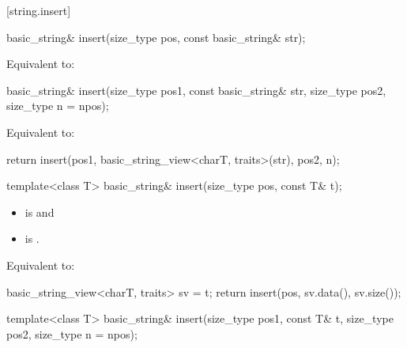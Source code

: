 [string.insert]{}

%
\begin{itemdecl}
basic_string& insert(size_type pos, const basic_string& str);
\end{itemdecl}

\begin{itemdescr}
\pnum
\effects Equivalent to: 
\end{itemdescr}

%
\begin{itemdecl}
basic_string& insert(size_type pos1, const basic_string& str, size_type pos2, size_type n = npos);
\end{itemdecl}

\begin{itemdescr}
\pnum
\effects
Equivalent to:
\begin{codeblock}
return insert(pos1, basic_string_view<charT, traits>(str), pos2, n);
\end{codeblock}
\end{itemdescr}

%
\begin{itemdecl}
template<class T>
  basic_string& insert(size_type pos, const T& t);
\end{itemdecl}

\begin{itemdescr}
\pnum
\constraints
\begin{itemize}
\item
{} is
 and
\item
{} is
.
\end{itemize}

\pnum
\effects
Equivalent to:
\begin{codeblock}
basic_string_view<charT, traits> sv = t;
return insert(pos, sv.data(), sv.size());
\end{codeblock}
\end{itemdescr}

%
\begin{itemdecl}
template<class T>
  basic_string& insert(size_type pos1, const T& t, size_type pos2, size_type n = npos);
\end{itemdecl}

